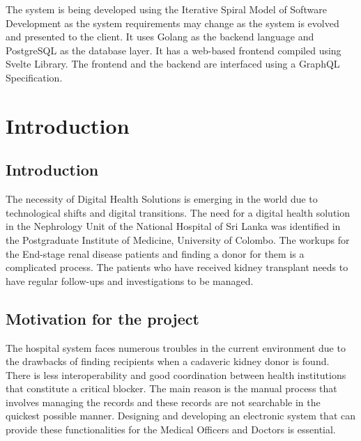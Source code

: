 \documentclass[12pt,a4paper]{report}
\renewcommand{\baselinestretch}{1.5}
\begin{document}
The system is being developed using the Iterative Spiral Model of Software Development as the system requirements may change as the system is evolved and presented to the client. It uses Golang as the backend language and PostgreSQL as the database layer. It has a web-based frontend compiled using Svelte Library. The frontend and the backend are interfaced using a GraphQL Specification. 

\newpage

%
%


\newpage 
\renewcommand{\baselinestretch}{1.5}\normalsize
\tableofcontents
{}

\listoffigures
 
\listoftables


\newpage

\setcounter{page}{1}


\chapter{Introduction}
\section{Introduction}
%
%

The necessity of Digital Health Solutions is emerging in the world due to technological shifts and digital transitions. The need for a digital health solution in the Nephrology Unit of the National Hospital of Sri Lanka was identified in the Postgraduate Institute of Medicine, University of Colombo. The workups for the End-stage renal disease patients and finding a donor for them is a complicated process. The patients who have received kidney transplant needs to have regular follow-ups and investigations to be managed. 

\section{Motivation for the project}
The hospital system faces numerous troubles in the current environment due to the drawbacks of finding recipients when a cadaveric kidney donor is found.  There is less interoperability and good coordination between health institutions that constitute a critical blocker. The main reason is the manual process that involves managing the records and these records are not searchable in the quickest possible manner. Designing and developing an electronic system that can provide these functionalities for the Medical Officers and Doctors is essential.  
\end{document}
